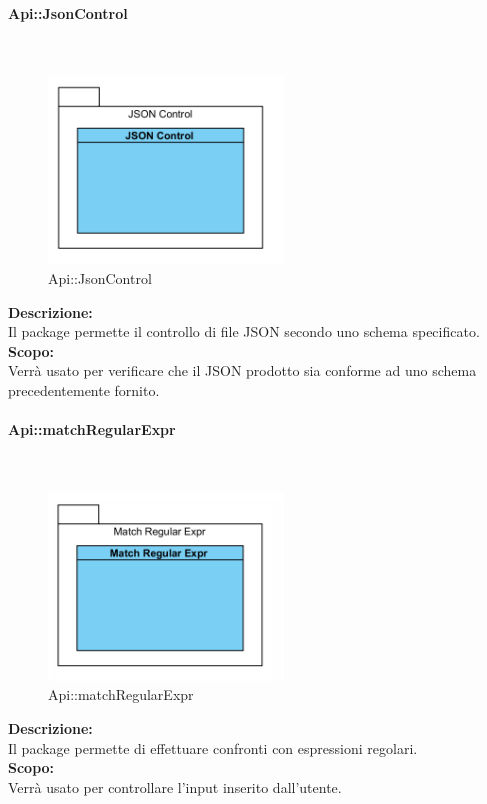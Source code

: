 \begin{samepage}
\paragraph{Api\-::Json\-Control}\label{api-json}\mbox{}\\
\nopagebreak
\begin{figure}[H]
	\centering
	\includegraphics[height=5cm]{diagrammi_img/classi_e_package/api_json.png}
	\caption{Api\-::Json\-Control}
\end{figure}
\end{samepage}
\textbf{Descrizione:}\\ 
Il package permette il controllo di file JSON secondo uno schema specificato.\\ 
\textbf{Scopo:}\\
Verrà usato per verificare che il JSON prodotto sia conforme ad uno schema precedentemente fornito.

\begin{samepage}
\paragraph{Api\-::match\-Regular\-Expr}\label{api-regexpr}\mbox{}\\
\nopagebreak
\begin{figure}[H]
	\centering
	\includegraphics[height=5cm]{diagrammi_img/classi_e_package/api_matchex.png}
	\caption{Api\-::match\-Regular\-Expr}
\end{figure}
\end{samepage}
\textbf{Descrizione:}\\ 
Il package permette di effettuare confronti con espressioni regolari.\\ 
\textbf{Scopo:}\\
Verrà usato per controllare l'input inserito dall'utente.


